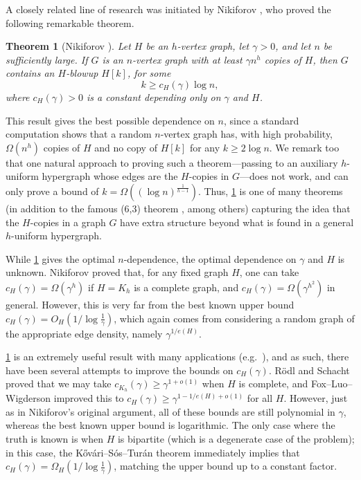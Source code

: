 \documentclass{aic}
\theoremstyle{plain}
\newtheorem{theorem}{Theorem}[section]
\theoremstyle{remark}
\begin{document}
A closely related line of research was initiated by Nikiforov \cite{MR2409174,MR2398823}, who proved the following remarkable theorem. 
\begin{theorem}[Nikiforov \cite{MR2409174,MR2398823}]\label{thm:nikiforov}
    Let $H$ be an $h$-vertex graph, let $\gamma>0$, and let $n$ be sufficiently large. If $G$ is an $n$-vertex graph with at least $\gamma n^h$ copies of $H$, then $G$ contains an $H$-blowup $H[k]$, for some
    \[
        k \geq c_H(\gamma) \log n,
    \]
    where $c_H(\gamma)>0$ is a constant depending only on $\gamma$ and $H$.
\end{theorem}
This result gives the best possible dependence on $n$, since a standard computation shows that a random $n$-vertex graph has, with high probability, $\Omega(n^h)$ copies of $H$ and no copy of $H[k]$ for any $k \geq 2\log n$. We remark too that one natural approach to proving such a theorem---passing to an auxiliary $h$-uniform hypergraph whose edges are the $H$-copies in $G$---does not work, and can only prove a bound of $k = \Omega((\log n)^{\frac{1}{h-1}})$. Thus, \cref{thm:nikiforov} is one of many theorems (in addition to the famous (6,3) theorem \cite{MR0519318}, among others) capturing the idea that the $H$-copies in a graph $G$ have extra structure beyond what is found in a general $h$-uniform hypergraph.

While \cref{thm:nikiforov} gives the optimal $n$-dependence, the optimal dependence on $\gamma$ and $H$ is unknown. Nikiforov proved that, for any fixed graph $H$, one can take $c_{H}(\gamma) = \Omega(\gamma^{h})$ if $H=K_h$ is a complete graph, and $c_H(\gamma)=\Omega(\gamma^{h^2})$ in general. However, this is very far from the best known upper bound $c_H(\gamma) = O_H(1/{\log \frac 1 \gamma})$, which again comes from considering a random graph of the appropriate edge density, namely $\gamma^{1/e(H)}$.

\cref{thm:nikiforov} is an extremely useful result with many applications (e.g.\ \cite{MR2520282,MR2993136,MR4625871,MR4195582}), and as such, there have been several attempts to improve the bounds on $c_H(\gamma)$. R\"odl and Schacht \cite{MR2993136} proved that we may take $c_{K_h}(\gamma) \geq \gamma^{1+o(1)}$ when $H$ is complete, and Fox--Luo--Wigderson \cite{MR4195582} improved this to $c_H(\gamma) \geq \gamma^{1-1/e(H)+o(1)}$ for all $H$. However, just as in Nikiforov's original argument, all of these bounds are still polynomial in $\gamma$, whereas the best known upper bound is logarithmic. The only case where the truth is known is when $H$ is bipartite (which is a degenerate case of the problem); in this case, the K\H ov\'ari--S\'os--Tur\'an theorem \cite{MR0065617} immediately implies that $c_H(\gamma) = \Omega_H(1/{\log \frac 1\gamma})$, matching the upper bound up to a constant factor.
\end{document}
